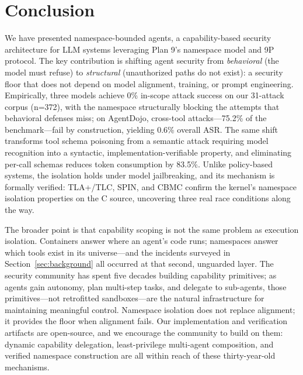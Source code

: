 \documentclass[acmsmall,screen,review]{acmart}
\begin{document}
\section{Conclusion}
\label{sec:conclusion}

We have presented namespace-bounded agents, a capability-based security architecture for LLM systems leveraging Plan 9's namespace model and 9P protocol. The key contribution is shifting agent security from \textit{behavioral} (the model must refuse) to \textit{structural} (unauthorized paths do not exist): a security floor that does not depend on model alignment, training, or prompt engineering. Empirically, three models achieve 0\% in-scope attack success on our 31-attack corpus (n=372), with the namespace structurally blocking the attempts that behavioral defenses miss; on AgentDojo, cross-tool attacks---75.2\% of the benchmark---fail by construction, yielding 0.6\% overall ASR. The same shift transforms tool schema poisoning from a semantic attack requiring model recognition into a syntactic, implementation-verifiable property, and eliminating per-call schemas reduces token consumption by 83.5\%. Unlike policy-based systems, the isolation holds under model jailbreaking, and its mechanism is formally verified: TLA+/TLC, SPIN, and CBMC confirm the kernel's namespace isolation properties on the C source, uncovering three real race conditions along the way.

The broader point is that capability scoping is not the same problem as execution isolation. Containers answer where an agent's code runs; namespaces answer which tools exist in its universe---and the incidents surveyed in Section~\ref{sec:background} all occurred at that second, unguarded layer. The security community has spent five decades building capability primitives; as agents gain autonomy, plan multi-step tasks, and delegate to sub-agents, those primitives---not retrofitted sandboxes---are the natural infrastructure for maintaining meaningful control. Namespace isolation does not replace alignment; it provides the floor when alignment fails. Our implementation and verification artifacts are open-source, and we encourage the community to build on them: dynamic capability delegation, least-privilege multi-agent composition, and verified namespace construction are all within reach of these thirty-year-old mechanisms.



\end{document}
